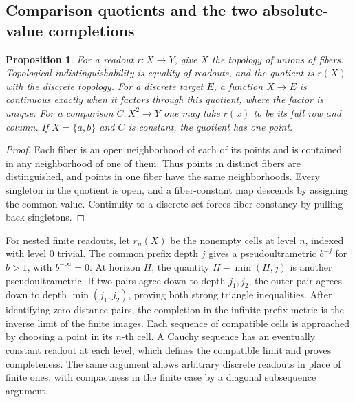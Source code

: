 \documentclass[11pt,reqno]{amsart}
\newtheorem{proposition}[theorem]{Proposition}
\theoremstyle{definition}
\theoremstyle{remark}
\numberwithin{equation}{section}
\begin{document}
\subsection{Comparison quotients and the two absolute-value completions}

\begin{proposition}\label{m9:quotient}
For a readout \(r:X\to Y\), give \(X\) the topology of unions
of fibers. Topological indistinguishability is equality of
readouts, and the quotient is \(r(X)\) with the discrete topology.
For a discrete target \(E\), a function \(X\to E\) is continuous
exactly when it factors through this quotient, where the factor
is unique. For a comparison \(C:X^2\to Y\) one may take \(r(x)\)
to be its full row and column. If \(X=\{a,b\}\) and \(C\) is
constant, the quotient has one point.
\end{proposition}
\begin{proof}
Each fiber is an open neighborhood of each of its points and
is contained in any neighborhood of one of them. Thus points
in distinct fibers are distinguished, and points in one fiber
have the same neighborhoods. Every singleton in the quotient is
open, and a fiber-constant map descends by assigning the common
value. Continuity to a discrete set forces fiber constancy by
pulling back singletons.
\end{proof}

For nested finite readouts, let \(r_n(X)\) be the nonempty
cells at level \(n\), indexed with level \(0\) trivial. The
common prefix depth \(j\) gives a pseudoultrametric \(b^{-j}\)
for \(b>1\), with \(b^{-\infty}=0\). At horizon \(H\), the
quantity \(H-\min(H,j)\) is another pseudoultrametric. If two
pairs agree down to depth \(j_1,j_2\), the outer pair agrees
down to depth \(\min(j_1,j_2)\), proving both strong triangle
inequalities. After identifying zero-distance pairs, the
completion in the infinite-prefix metric is the inverse limit
of the finite images. Each sequence of compatible cells is
approached by choosing a point in its \(n\)-th cell. A Cauchy
sequence has an eventually constant readout at each level,
which defines the compatible limit and proves completeness.
The same argument allows arbitrary discrete readouts in
place of finite ones, with compactness in the finite case
by a diagonal subsequence argument.
\end{document}
